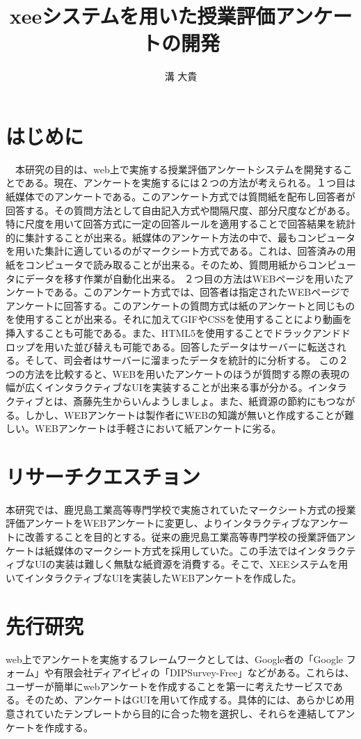 \documentclass[11pt,a4paper]{jsarticle}
\title{xeeシステムを用いた授業評価アンケートの開発}
\author{溝 大貴}
\begin{document}
\maketitle
%
%
\section{はじめに}
　本研究の目的は、web上で実施する授業評価アンケートシステムを開発することである。現在、アンケートを実施するには２つの方法が考えられる。１つ目は紙媒体でのアンケートである。このアンケート方式では質問紙を配布し回答者が回答する。その質問方法として自由記入方式や間隔尺度、部分尺度などがある。特に尺度を用いて回答方式に一定の回答ルールを適用することで回答結果を統計的に集計することが出来る。紙媒体のアンケート方法の中で、最もコンピュータを用いた集計に適しているのがマークシート方式である。これは、回答済みの用紙をコンピュータで読み取ることが出来る。そのため、質問用紙からコンピュータにデータを移す作業が自動化出来る。
２つ目の方法はWEBページを用いたアンケートである。このアンケート方式では、回答者は指定されたWEBページでアンケートに回答する。このアンケートの質問方式は紙のアンケートと同じものを使用することが出来る。それに加えてGIFやCSSを使用することにより動画を挿入することも可能である。また、HTML5を使用することでドラックアンドドロップを用いた並び替えも可能である。回答したデータはサーバーに転送される。そして、司会者はサーバーに溜まったデータを統計的に分析する。
この２つの方法を比較すると、WEBを用いたアンケートのほうが質問する際の表現の幅が広くインタラクティブなUIを実装することが出来る事が分かる。インタラクティブとは、斎藤先生からいんようしましょ。また、紙資源の節約にもつながる。しかし、WEBアンケートは製作者にWEBの知識が無いと作成することが難しい。WEBアンケートは手軽さにおいて紙アンケートに劣る。

\section{リサーチクエスチョン}
本研究では、鹿児島工業高等専門学校で実施されていたマークシート方式の授業評価アンケートをWEBアンケートに変更し、よりインタラクティブなアンケートに改善することを目的とする。従来の鹿児島工業高等専門学校の授業評価アンケートは紙媒体のマークシート方式を採用していた。この手法ではインタラクティブなUIの実装は難しく無駄な紙資源を消費する。そこで、XEEシステムを用いてインタラクティブなUIを実装したWEBアンケートを作成した。

\section{先行研究}
web上でアンケートを実施するフレームワークとしては、Google者の「Google フォーム」や有限会社ディアイピィの「DIPSurvey-Free」などがある。これらは、ユーザーが簡単にwebアンケートを作成することを第一に考えたサービスである。そのため、アンケートはGUIを用いて作成する。具体的には、あらかじめ用意されていたテンプレートから目的に合った物を選択し、それらを連結してアンケートを作成する。
\end{document}
